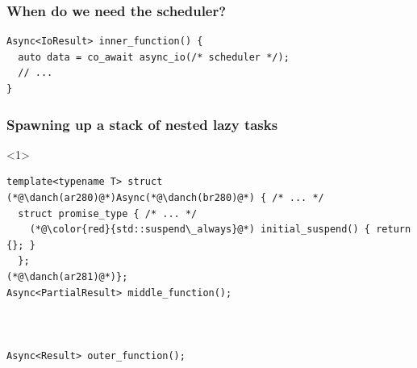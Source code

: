 \documentclass[aspectratio=169]{beamer}
\newcommand\danch{}
\def\danch(#1){\tikz[baseline,inner sep=0]\node[anchor=base](#1){};}
\begin{document}
\begin{frame}[fragile]
  \frametitle{When do we need the scheduler?}
  
  \begin{lstlisting}[style=cpp20]
Async<IoResult> inner_function() {
  auto data = co_await async_io(/* scheduler */);
  // ...
}
  \end{lstlisting}
  
\end{frame}

\begin{frame}[fragile]
  \frametitle{Spawning up a stack of nested lazy tasks}

  \begin{onlyenv}<1>
  \begin{lstlisting}[style=cpp20]
template<typename T> struct (*@\danch(ar280)@*)Async(*@\danch(br280)@*) { /* ... */
  struct promise_type { /* ... */
    (*@\color{red}{std::suspend\_always}@*) initial_suspend() { return {}; }
  };
(*@\danch(ar281)@*)};
Async<PartialResult> middle_function();



Async<Result> outer_function();




\end{lstlisting}
\end{onlyenv}
\end{frame}
\end{document}
